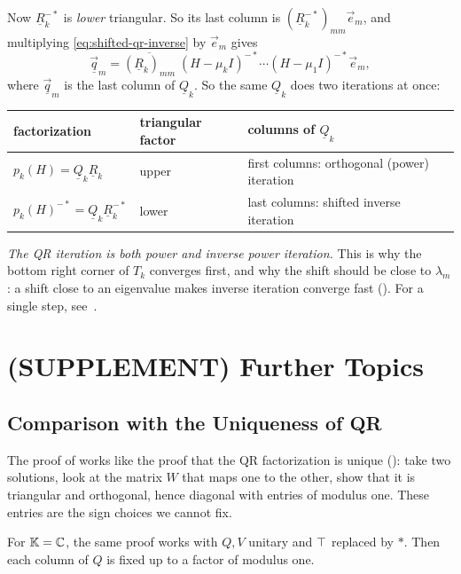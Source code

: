 Now $\underline{R}_k^{-\ast}$ is \emph{lower} triangular. So its last column is $(\underline{R}_k^{-\ast})_{mm}\vec{e}_m$, and multiplying \eqref{eq:shifted-qr-inverse} by $\vec{e}_m$ gives
\begin{equation}
  \underline{\vec{q}}_m = \overline{(\underline{R}_k)_{mm}}\;(H - \mu_kI)^{-\ast}\cdots(H - \mu_1I)^{-\ast}\vec{e}_m,
\end{equation}
where $\underline{\vec{q}}_m$ is the last column of $\underline{Q}_k$. So the same $\underline{Q}_k$ does two iterations at once:
\begin{center}
  \begin{tabular}{lll}
    \toprule
    factorization & triangular factor & columns of $\underline{Q}_k$ \\
    \midrule
    $p_k(H) = \underline{Q}_k\underline{R}_k$ & upper & first columns: orthogonal (power) iteration \\
    $p_k(H)^{-\ast} = \underline{Q}_k\underline{R}_k^{-\ast}$ & lower & last columns: shifted inverse iteration \\
    \bottomrule
  \end{tabular}
\end{center}
\emph{The QR iteration is both power and inverse power iteration.} This is why the bottom right corner of $T_k$ converges first, and why the shift should be close to $\lambda_m$: a shift close to an eigenvalue makes inverse iteration converge fast (). For a single step, see~\cite[Section 4.4.4]{Demmel}.

\section{(SUPPLEMENT) Further Topics}

\subsection{Comparison with the Uniqueness of QR}

The proof of  works like the proof that the QR factorization is unique (): take two solutions, look at the matrix $W$ that maps one to the other, show that it is triangular and orthogonal, hence diagonal with entries of modulus one. These entries are the sign choices we cannot fix.

For $\mathbb{K} = \mathbb{C}$, the same proof works with $Q, V$ unitary and $\top$ replaced by $\ast$. Then each column of $Q$ is fixed up to a factor of modulus one.

